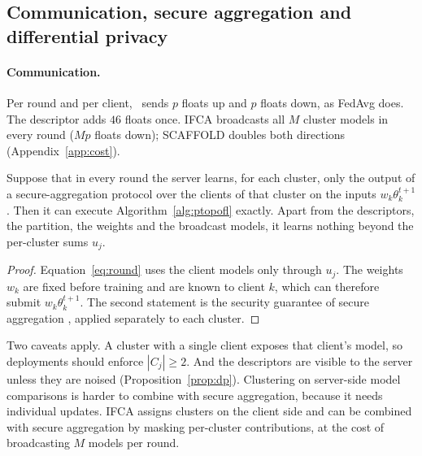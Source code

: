 \subsection{Communication, secure aggregation and differential privacy}
\label{sec:comm}

\paragraph{Communication.}
Per round and per client, \ptopofl\ sends $p$ floats up and $p$ floats down, as FedAvg does.
The descriptor adds $46$ floats once. IFCA broadcasts all $M$ cluster models in every round
($Mp$ floats down); SCAFFOLD doubles both directions (Appendix~\ref{app:cost}).

\begin{proposition}
\label{prop:secagg}
Suppose that in every round the server learns, for each cluster, only the output of a
secure-aggregation protocol over the clients of that cluster on the inputs
$w_k\theta_k^{t+1}$. Then it can execute Algorithm~\ref{alg:ptopofl} exactly. Apart from the
descriptors, the partition, the weights and the broadcast models, it learns nothing beyond
the per-cluster sums $u_j$.
\end{proposition}
\begin{proof}
Equation~\eqref{eq:round} uses the client models only through $u_j$. The weights $w_k$ are
fixed before training and are known to client $k$, which can therefore submit
$w_k\theta_k^{t+1}$. The second statement is the security guarantee of secure aggregation
\citep{bonawitz2017practical}, applied separately to each cluster.
\end{proof}

Two caveats apply. A cluster with a single client exposes that client's model, so
deployments should enforce $|C_j|\ge2$. And the descriptors are visible to the server unless
they are noised (Proposition~\ref{prop:dp}). Clustering on server-side model comparisons
\citep{sattler2020clustered,long2023multi} is harder to combine with secure aggregation,
because it needs individual updates. IFCA assigns clusters on the client side and can be
combined with secure aggregation by masking per-cluster contributions, at the cost of
broadcasting $M$ models per round.

